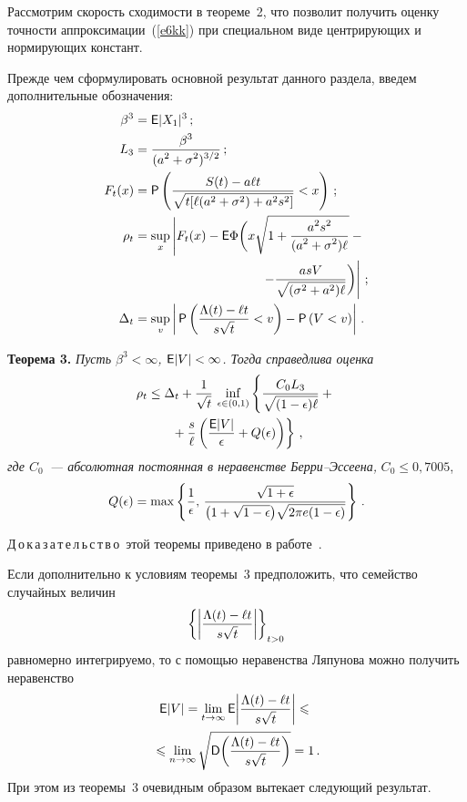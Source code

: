 \begin{multicols}{2}
Рассмотрим скорость сходимости в теореме~2, что позволит получить
оценку точности аппроксимации~(\ref{e6kk}) при специальном виде
центрирующих и нормирующих констант.

Прежде чем сформулировать основной результат данного раздела,
введем дополнительные обозначения:
\begin{align*}
\beta^3 &= \e|X_1|^3\,;\\
L_3 &= \fr{\beta^3}{(a^2+\sigma^2)^{3/2}}\,;\\
F_t(x) &= \p\left(\fr{S(t)-a\ell t}{\sqrt{t[\ell(a^2+\sigma^2)+a^2s^2]}}< x\right)\,;\\
\rho_t & =\sup_x \left|F_t(x) - {\sf E}\Phi\bigg(x\sqrt{1+\fr{a^2s^2}{(a^2+\sigma^2)\ell}}-{}\right.\\
&\left.\hspace*{100pt}-\fr{asV}{\sqrt{(\sigma^2+a^2)\ell}}\bigg)
\right|\,;\\
\Delta_t &= \sup_{v}\left|\,\p\left(\fr{\Lambda(t)-\ell
t}{s\sqrt{t}}<v\right)-\p \left(V <v\right)\right|\,.
\end{align*}

\smallskip

\noindent
\textbf{Теорема 3.} {\it Пусть $\beta^3<\infty$, ${\sf E} |V| < \infty$.
Тогда справедлива оценка
\begin{multline*}
\rho_t \leq \Delta_t
+\displaystyle\frac{\displaystyle 1\mathstrut}{\displaystyle \sqrt{t}\mathstrut}\,\inf_{\epsilon\in(0,1)}\left\{\displaystyle\frac{\displaystyle C_0L_3\mathstrut}{\displaystyle \sqrt{(1-\epsilon)\ell}\mathstrut}+{}\right.\\
\left.{}+\displaystyle\frac{\displaystyle s\mathstrut}{\displaystyle \ell\mathstrut}\left(\displaystyle\frac{\displaystyle {\sf
E}|V|\mathstrut}{\displaystyle \epsilon\mathstrut}+Q(\epsilon)\right)\right\}\,,
\end{multline*}
где $C_0$~--- абсолютная постоянная в неравенстве Берри--Эссеена,}
$C_0\le 0{,}7005$,
$$
Q(\epsilon)=\max\left\{\displaystyle\frac{\displaystyle 1\mathstrut}{\displaystyle \epsilon\mathstrut},\,\displaystyle\frac{\displaystyle \sqrt{1+\epsilon}\mathstrut}{\displaystyle \big(1+\sqrt{1-\epsilon}\big)\sqrt{2\pi
e(1-\epsilon)}\mathstrut}\right\}\,.
$$

\smallskip

\noindent
Д\,о\,к\,а\,з\,а\,т\,е\,л\,ь\,с\,т\,в\,о\ этой теоремы приведено в работе~\cite{14kk}.

\smallskip

Если дополнительно к условиям теоремы~3 предположить, что
семейство случайных величин
$$
\left\{\left|\displaystyle\frac{\displaystyle \Lambda(t)-\ell
t\mathstrut}{\displaystyle s\sqrt{t}\mathstrut}\right|\right\}_{t>0}
$$
равномерно интегрируемо, то с помощью неравенства Ляпунова можно
получить неравенство
\begin{multline}
{\sf E}|V|=\lim_{t\to\infty}{\sf E}\bigg|\displaystyle\frac{\displaystyle \Lambda(t)-\ell
t\mathstrut}{\displaystyle s\sqrt{t}\mathstrut}\bigg|\leqslant{}\\
{}\leqslant\lim_{n\to\infty}\sqrt{{\sf
D}\bigg(\displaystyle\frac{\displaystyle \Lambda(t)-\ell t\mathstrut}{\displaystyle s\sqrt{t}\mathstrut}\bigg)}=1\,.
\label{e7kk}
\end{multline}
При этом из теоремы~3 очевидным образом вытекает следующий
результат.


\end{multicols}

